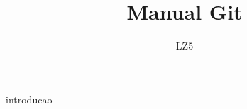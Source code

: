 \documentclass[a4paper,11pt]{article}
\title{Manual Git}
\author{LZ5}
\begin{document}
\maketitle
\newpage
\tableofcontents
\newpage
 {introducao}

\end{document}
